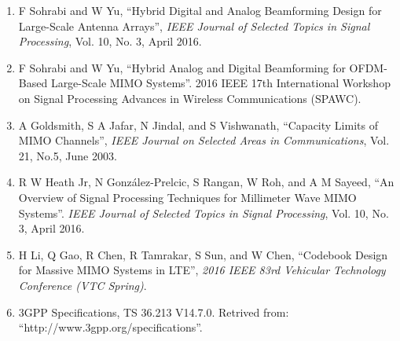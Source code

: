 \documentclass[12pt]{article}
\begin{document}
\begin{enumerate}

\item F Sohrabi and W Yu, ``Hybrid Digital and Analog Beamforming Design for Large-Scale Antenna Arrays'', \textit{IEEE Journal of Selected Topics in Signal Processing}, Vol. 10, No. 3, April 2016.

\item F Sohrabi and W Yu, ``Hybrid Analog and Digital Beamforming for OFDM-Based Large-Scale MIMO Systems''. 2016 IEEE 17th International Workshop on Signal Processing Advances in Wireless Communications (SPAWC).

\item A Goldsmith, S A Jafar, N Jindal, and S Vishwanath, ``Capacity Limits of MIMO Channels'', \textit{IEEE Journal on Selected Areas in Communications}, Vol. 21, No.5, June 2003.

\item R W Heath Jr, N González-Prelcic, S Rangan, W Roh, and A M Sayeed, ``An Overview of Signal Processing Techniques for Millimeter Wave MIMO Systems''. \textit{IEEE Journal of Selected Topics in Signal Processing}, Vol. 10, No. 3, April 2016.

\item H Li, Q Gao, R Chen, R Tamrakar, S Sun, and W Chen, ``Codebook Design for Massive MIMO Systems in LTE'', \textit{2016 IEEE 83rd Vehicular Technology Conference (VTC Spring)}.

\item 3GPP Specifications, TS 36.213 V14.7.0. Retrived from: \\ ``http://www.3gpp.org/specifications''.

\end{enumerate}
\end{document}
